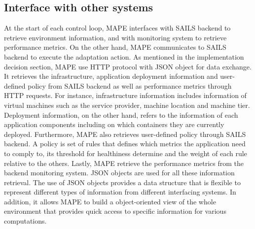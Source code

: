 \documentclass{seal_thesis}
\begin{document}
\subsection{Interface with other systems}
At the start of each control loop, MAPE interfaces with SAILS backend to retrieve environment information, and with monitoring system to retrieve performance metrics. On the other hand, MAPE communicates to SAILS backend to execute the adaptation action.
As mentioned in the implementation decision section, MAPE use HTTP protocol with JSON object for data exchange.
It retrieves the infrastructure, application deployment information and user-defined policy from SAILS backend as well as performance metrics through HTTP requests.
For instance, infrastructure information includes information of virtual machines such as the service provider, machine location and machine tier. Deployment information, on the other hand, refers to the information of each application components including on which containers they are currently deployed.
Furthermore, MAPE also retrieves user-defined policy through SAILS backend. A policy is set of rules that defines which metrics the application need to comply to, its threshold for healthiness determine and the weight of each rule relative to the others.
Lastly, MAPE retrieve the performance metrics from the backend monitoring system.
JSON objects are used for all these information retrieval.
The use of JSON objects provides a data structure that is flexible to represent different types of information from different interfacing systems.
In addition, it allows MAPE to build a object-oriented view of the whole environment that provides quick access to specific information for various computations.
\end{document}
